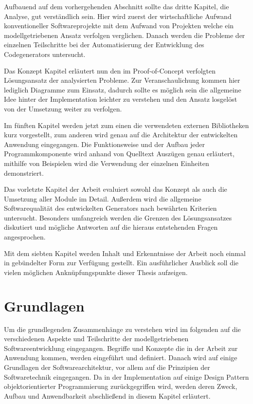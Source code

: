 \documentclass[12pt,oneside,a4paper,parskip]{scrbook}
\begin{document}
Aufbauend auf dem vorhergehenden Abschnitt sollte das dritte Kapitel, die Analyse, gut verständlich sein. Hier wird zuerst der wirtschaftliche Aufwand konventioneller Softwareprojekte mit dem Aufwand von Projekten welche ein modellgetriebenen Ansatz verfolgen verglichen. Danach werden die Probleme der einzelnen Teilschritte bei der Automatisierung der Entwicklung des Codegenerators untersucht.

Das Konzept Kapitel erläutert nun den im Proof-of-Concept verfolgten Lösungsansatz der analysierten Probleme. Zur Veranschaulichung kommen hier lediglich Diagramme zum Einsatz, dadurch sollte es möglich sein die allgemeine Idee hinter der Implementation leichter zu verstehen und den Ansatz losgelöst von der Umsetzung weiter zu verfolgen.

Im fünften Kapitel werden jetzt zum einen die verwendeten externen Bibliotheken kurz vorgestellt, zum anderen wird genau auf die Architektur der entwickelten Anwendung eingegangen. Die Funktionsweise und der Aufbau jeder Programmkomponente wird anhand von Quelltext Auszügen genau erläutert, mithilfe von Beispielen wird die Verwendung der einzelnen Einheiten demonstriert.

Das vorletzte Kapitel der Arbeit evaluiert sowohl das Konzept als auch die Umsetzung aller Module im Detail. Außerdem wird die allgemeine Softwarequalität des entwickelten Generators nach bewährten Kriterien untersucht. Besonders umfangreich werden die Grenzen des Lösungsansatzes diskutiert und mögliche Antworten auf die hieraus entstehenden Fragen angesprochen.

Mit dem siebten Kapitel werden Inhalt und Erkenntnisse der Arbeit noch einmal in gebündelter Form zur Verfügung gestellt. Ein ausführlicher Ausblick soll die vielen möglichen Anknüpfungspunkte dieser Thesis aufzeigen.

\chapter{Grundlagen}

Um die grundlegenden Zusammenhänge zu verstehen wird im folgenden auf die verschiedenen Aspekte und Teilschritte der modellgetriebenen Softwareentwicklung eingegangen. Begriffe und Konzepte die in der Arbeit zur Anwendung kommen, werden eingeführt und definiert. Danach wird auf einige Grundlagen der Softwarearchitektur, vor allem auf die Prinzipien der Softwaretechnik eingegangen. Da in der Implementation auf einige Design Pattern objektorientierter Programmierung zurückgegriffen wird, werden deren Zweck, Aufbau und Anwendbarkeit abschließend in diesem Kapitel erläutert.
\end{document}
